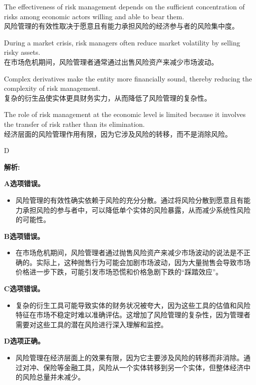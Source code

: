 \documentclass{article}
\newenvironment{explanation}
{\textbf{解析:}\par}
{\par}
\begin{document}
\begin{choices}
   \item The effectiveness of risk management depends on the sufficient concentration of risks among economic actors willing and able to bear them. \\
   风险管理的有效性取决于愿意且有能力承担风险的经济参与者的风险集中度。

   
   \item During a market crisis, risk managers often reduce market volatility by selling risky assets. \\
   在市场危机期间，风险管理者通常通过出售风险资产来减少市场波动。
   
   \item Complex derivatives make the entity more financially sound, thereby reducing the complexity of risk management. \\
   复杂的衍生品使实体更具财务实力，从而降低了风险管理的复杂性。
   
   \item The role of risk management at the economic level is limited because it involves the transfer of risk rather than its elimination. \\
   经济层面的风险管理作用有限，因为它涉及风险的转移，而不是消除风险。
\end{choices}

\begin{correctanswer}
   D
\end{correctanswer}


\begin{explanation}
    \textbf{A选项错误。}
    \begin{itemize}
        \item 风险管理的有效性确实依赖于风险的充分分散。通过将风险分散到愿意且有能力承担风险的参与者中，可以降低单个实体的风险暴露，从而减少系统性风险的可能性。
    \end{itemize}
    
    \textbf{B选项错误。}
    \begin{itemize}
        \item 在市场危机期间，风险管理者通过抛售风险资产来减少市场波动的说法是不正确的。实际上，这种抛售行为可能会加剧市场波动，因为大量抛售会导致市场价格进一步下跌，可能引发市场恐慌和价格急剧下跌的“踩踏效应”。
    \end{itemize}
    
    \textbf{C选项错误。}
    \begin{itemize}
        \item 复杂的衍生工具可能导致实体的财务状况被夸大，因为这些工具的估值和风险特征在市场不稳定时难以准确评估。这增加了风险管理的复杂性，因为管理者需要对这些工具的潜在风险进行深入理解和监控。
    \end{itemize}
    
    \textbf{D选项正确。}
    \begin{itemize}
        \item 风险管理在经济层面上的效果有限，因为它主要涉及风险的转移而非消除。通过对冲、保险等金融工具，风险从一个实体转移到另一个实体，但整体经济中的风险总量并未减少。
    \end{itemize}
\end{explanation}
\end{document}
